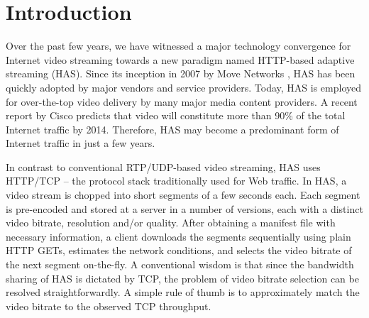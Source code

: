 \documentclass[conference]{IEEEtran}
\theoremstyle{plain}
\theoremstyle{definition}
\theoremstyle{plain}
\theoremstyle{plain}
\begin{document}
\IEEEpeerreviewmaketitle


\section{Introduction}

Over the past few years, we have witnessed a major technology convergence
for Internet video streaming towards a new paradigm named HTTP-based
adaptive streaming (HAS). Since its inception in 2007 by Move Networks
\cite{move07}, HAS has been quickly adopted by major vendors and
service providers. Today, HAS is employed for over-the-top video delivery
by many major media content providers. A recent report by Cisco \cite{CiscoWhitePaper}
predicts that video will constitute more than 90\% of the total Internet
traffic by 2014. Therefore, HAS may become a predominant form of Internet
traffic in just a few years.

In contrast to conventional RTP/UDP-based video streaming, HAS uses
HTTP/TCP -- the protocol stack traditionally used for Web traffic.
In HAS, a video stream is chopped into short segments of a few seconds
each. Each segment is pre-encoded and stored at a server in a number
of versions, each with a distinct video bitrate, resolution and/or
quality. After obtaining a manifest file with necessary information,
a client downloads the segments sequentially using plain HTTP GETs,
estimates the network conditions, and selects the video bitrate of
the next segment on-the-fly. A conventional wisdom is that since the
bandwidth sharing of HAS is dictated by TCP, the problem of video
bitrate selection can be resolved straightforwardly. A simple rule
of thumb is to approximately match the video bitrate to the observed
TCP throughput. 
\end{document}
